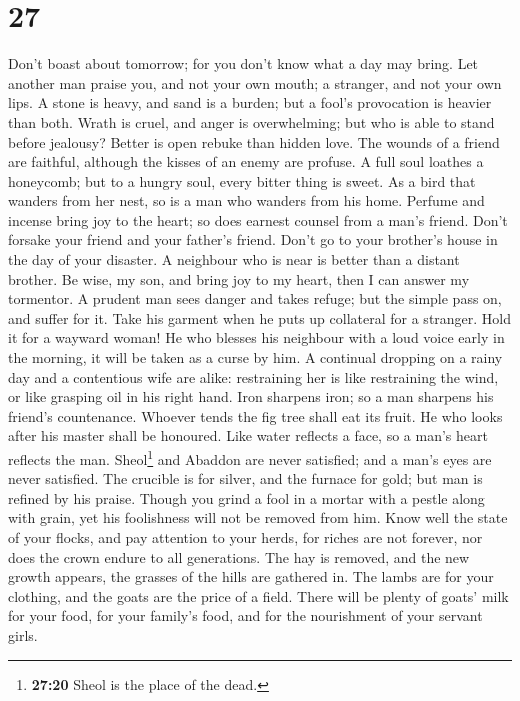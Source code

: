 \hypertarget{section-22}{%
\section{27}\label{section-22}}

 Don't boast about tomorrow; for you don't know what a day
may bring.  Let another man praise you, and not your own
mouth; a stranger, and not your own lips.  A stone is
heavy, and sand is a burden; but a fool's provocation is heavier than
both.  Wrath is cruel, and anger is overwhelming; but who
is able to stand before jealousy?  Better is open rebuke
than hidden love.  The wounds of a friend are faithful,
although the kisses of an enemy are profuse.  A full soul
loathes a honeycomb; but to a hungry soul, every bitter thing is sweet.
 As a bird that wanders from her nest, so is a man who
wanders from his home.  Perfume and incense bring joy to
the heart; so does earnest counsel from a man's friend. 
Don't forsake your friend and your father's friend. Don't go to your
brother's house in the day of your disaster. A neighbour who is near is
better than a distant brother.  Be wise, my son, and
bring joy to my heart, then I can answer my tormentor.  A
prudent man sees danger and takes refuge; but the simple pass on, and
suffer for it.  Take his garment when he puts up
collateral for a stranger. Hold it for a wayward woman! 
He who blesses his neighbour with a loud voice early in the morning, it
will be taken as a curse by him.  A continual dropping on
a rainy day and a contentious wife are alike: 
restraining her is like restraining the wind, or like grasping oil in
his right hand.  Iron sharpens iron; so a man sharpens
his friend's countenance.  Whoever tends the fig tree
shall eat its fruit. He who looks after his master shall be honoured.
 Like water reflects a face, so a man's heart reflects
the man.  Sheol\footnote{\textbf{27:20} Sheol is the
  place of the dead.} and Abaddon are never satisfied; and a man's eyes
are never satisfied.  The crucible is for silver, and the
furnace for gold; but man is refined by his praise. 
Though you grind a fool in a mortar with a pestle along with grain, yet
his foolishness will not be removed from him.  Know well
the state of your flocks, and pay attention to your herds,
 for riches are not forever, nor does the crown endure to
all generations.  The hay is removed, and the new growth
appears, the grasses of the hills are gathered in.  The
lambs are for your clothing, and the goats are the price of a field.
 There will be plenty of goats' milk for your food, for
your family's food, and for the nourishment of your servant girls.

